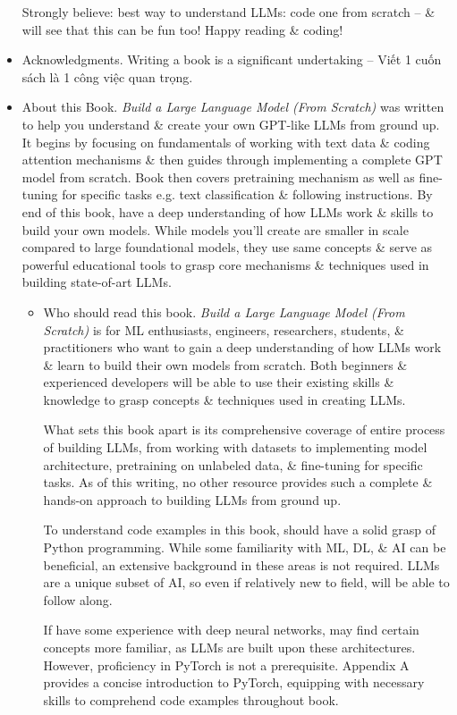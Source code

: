 \documentclass{article}
\begin{document}
\begin{itemize}
	Strongly believe: best way to understand LLMs: code one from scratch -- \& will see that this can be fun too! Happy reading \& coding!
	\item {\sf Acknowledgments.} Writing a book is a significant undertaking -- Viết 1 cuốn sách là 1  công việc quan trọng.
	\item {\sf About this Book.} {\it Build a Large Language Model (From Scratch)} was written to help you understand \& create your own GPT-like LLMs from ground up. It begins by focusing on fundamentals of working with text data \& coding attention mechanisms \& then guides through implementing a complete GPT model from scratch. Book then covers pretraining mechanism as well as fine-tuning for specific tasks e.g. text classification \& following instructions. By end of this book, have a deep understanding of how LLMs work \& skills to build your own models. While models you'll create are smaller in scale compared to large foundational models, they use same concepts \& serve as powerful educational tools to grasp core mechanisms \& techniques used in building state-of-art LLMs.
	\begin{itemize}
		\item {\sf Who should read this book.} {\it Build a Large Language Model (From Scratch)} is for ML enthusiasts, engineers, researchers, students, \& practitioners who want to gain a deep understanding of how LLMs work \& learn to build their own models from scratch. Both beginners \& experienced developers will be able to use their existing skills \& knowledge to grasp concepts \& techniques used in creating LLMs.
		
		What sets this book apart is its comprehensive coverage of entire process of building LLMs, from working with datasets to implementing model architecture, pretraining on unlabeled data, \& fine-tuning for specific tasks. As of this writing, no other resource provides such a complete \& hands-on approach to building LLMs from ground up.
		
		To understand code examples in this book, should have a solid grasp of Python programming. While some familiarity with ML, DL, \& AI can be beneficial, an extensive background in these areas is not required. LLMs are a unique subset of AI, so even if relatively new to field, will be able to follow along.
		
		If have some experience with deep neural networks, may find certain concepts more familiar, as LLMs are built upon these architectures. However, proficiency in PyTorch is not a prerequisite. Appendix A provides a concise introduction to PyTorch, equipping with necessary skills to comprehend code examples throughout book.
		

\end{itemize}
\end{itemize}
\end{document}
